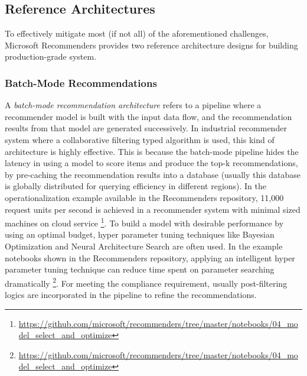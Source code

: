 \subsection{Reference Architectures}

To effectively mitigate most (if not all) of the aforementioned challenges, Microsoft Recommenders provides two reference architecture designs for building production-grade system. 

\subsubsection{Batch-Mode Recommendations}
A \textit{batch-mode recommendation architecture} refers to a pipeline where a recommender model is built with the input data flow, and the recommendation results from that model are generated successively. In industrial recommender system where a collaborative filtering typed algorithm is used, this kind of architecture is highly effective. This is because the batch-mode pipeline hides the latency in using a model to score items and produce the top-k recommendations, by pre-caching the recommendation results into a database (usually this database is globally distributed for querying efficiency in different regions). In the operationalization example available in the Recommenders repository, 11,000 request units per second is achieved in a recommender system with minimal sized machines on cloud service \footnote{\url{https://github.com/microsoft/recommenders/tree/master/notebooks/04_model_select_and_optimize}}. To build a model with desirable performance by using an optimal budget, hyper parameter tuning techniques like Bayesian Optimization \cite{snoek2012practical} and Neural Architecture Search \cite{zoph2016neural} are often used. In the example notebooks shown in the Recommenders repository, applying an intelligent hyper parameter tuning technique can reduce time spent on parameter searching dramatically \footnote{\url{https://github.com/microsoft/recommenders/tree/master/notebooks/04_model_select_and_optimize}}. For meeting the compliance requirement, usually post-filtering logics are incorporated in the pipeline to refine the recommendations.

